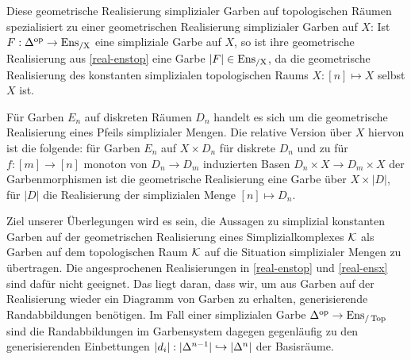\begin{bem} \label{real-ensx}
  Diese geometrische Realisierung simplizialer Garben auf
  topologischen Räumen spezialisiert zu einer geometrischen
  Realisierung simplizialer Garben auf $X$: Ist
  $F: \Delta^\mathrm{op} \to \operatorname{Ens_{/X}}$ eine simpliziale Garbe auf $X$, so ist ihre
  geometrische Realisierung aus \ref{real-enstop} eine Garbe
  $|F| \in \operatorname{Ens_{/X}}$, da die geometrische Realisierung des konstanten
  simplizialen topologischen Raums $X: [n] \mapsto X$ selbst $X$ ist.

  Für Garben $E_n$ auf diskreten Räumen $D_n$ handelt es sich um die
  geometrische Realisierung eines Pfeils simplizialer Mengen. Die
  relative Version über $X$ hiervon ist die folgende: für Garben $E_n$
  auf $X \times D_n$ für diskrete $D_n$ und zu für $f: [m] \to [n]$
  monoton von $D_n \to D_m$ induzierten Basen $D_n \times X \to
  D_m \times X$ der Garbenmorphismen ist die geometrische Realisierung
  eine Garbe über $X \times |D|$, für $|D|$ die Realisierung der
  simplizialen Menge $[n] \mapsto D_n$.
\end{bem}

Ziel unserer Überlegungen wird es sein, die Aussagen zu simplizial
konstanten Garben auf der geometrischen Realisierung eines
Simplizialkomplexes $\mathcal{K}$ als Garben auf dem topologischen Raum $\mathcal{K}$
auf die Situation simplizialer Mengen zu übertragen. Die
angesprochenen Realisierungen in \ref{real-enstop} und \ref{real-ensx}
sind dafür nicht geeignet. Das liegt daran, dass wir, um aus Garben
auf der Realisierung wieder ein Diagramm von Garben zu erhalten,
generisierende Randabbildungen benötigen. Im Fall einer simplizialen
Garbe $\Delta^\mathrm{op} \to \operatorname{Ens}_{/\operatorname{Top}}$ sind die Randabbildungen im
Garbensystem dagegen gegenläufig zu den generisierenden Einbettungen
$|d_i|: |\Delta^{n-1}| \hookrightarrow |\Delta^n|$ der Basisräume.

